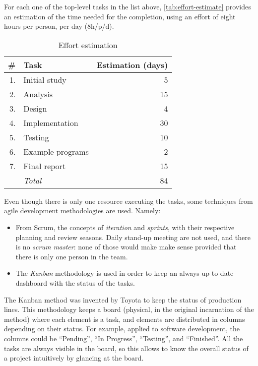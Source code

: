 For each one of the top-level tasks in the list above,
\autoref{tab:effort-estimate} provides an estimation of the time needed for
the completion, using an effort of eight hours per person, per day (8h/p/d).

\begin{table}
	\centering
	\begin{tabular}{rlr}
		\toprule
		\# & Task & Estimation (days) \\
		\midrule
		1. & Initial study     &  5 \\
		2. & Analysis          & 15 \\
		3. & Design            &  4 \\
		4. & Implementation    & 30 \\
		5. & Testing           & 10 \\
		6. & Example programs  &  2 \\
		7. & Final report      & 15 \\
		\midrule
		   & \emph{Total}      & 84 \\
		\bottomrule
	\end{tabular}
	\caption{Effort estimation}
	\label{tab:effort-estimate}
\end{table}

Even though there is only one resource executing the tasks, some techniques
from agile development methodologies are used. Namely:

\begin{itemize}
	\item From Scrum, the concepts of \emph{iteration} and \emph{sprints}, with
    their respective planning and review seasons. Daily stand-up meeting are
    not used, and there is no \emph{scrum master}: none of those would make
    make sense provided that there is only one person in the team.
  \item The \emph{Kanban} methodology is used in order to keep an always
		up to date dashboard with the status of the tasks.
\end{itemize}

The Kanban method was invented by \gls{Toyota} to keep the status of
production lines. This methodology keeps a board (physical, in the original
incarnation of the method) where each element is a task, and elements are
distributed in columns depending on their status. For example, applied to
software development, the columns could be “Pending”, “In Progress”,
“Testing”, and “Finished”. All the tasks are always visible in the board, so
this allows to know the overall status of a project intuitively by glancing at
the board.
